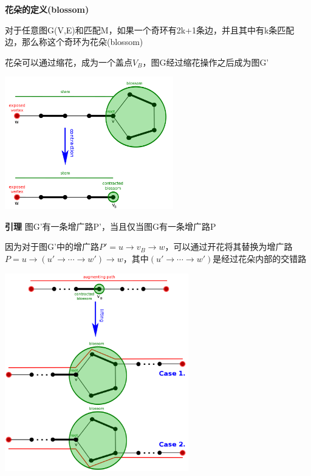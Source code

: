 \documentclass[UTF8]{ctexart}
\begin{document}
\vspace{0.2cm}

\textbf{花朵的定义(blossom)}

对于任意图G(V,E)和匹配M，如果一个奇环有2k+1条边，并且其中有k条匹配边，那么称这个奇环为花朵(blossom)

\vspace{0.2cm}

花朵可以通过缩花，成为一个盖点$V_B$，图G经过缩花操作之后成为图G'

\includegraphics[width=0.55\textwidth]{img/1000px-Edmonds_blossom.svg.png}


\textbf{引理}
图G'有一条增广路P'，当且仅当图G有一条增广路P

因为对于图G'中的增广路$P'=u\to v_B\to w$，可以通过开花将其替换为增广路$P=u\to(u'\to\cdots\to w')\to w$，其中$(u'\to\cdots\to w')$是经过花朵内部的交错路


\includegraphics[width=0.6\textwidth]{img/1000px-Edmonds_lifting_path.svg.png}
\end{document}
